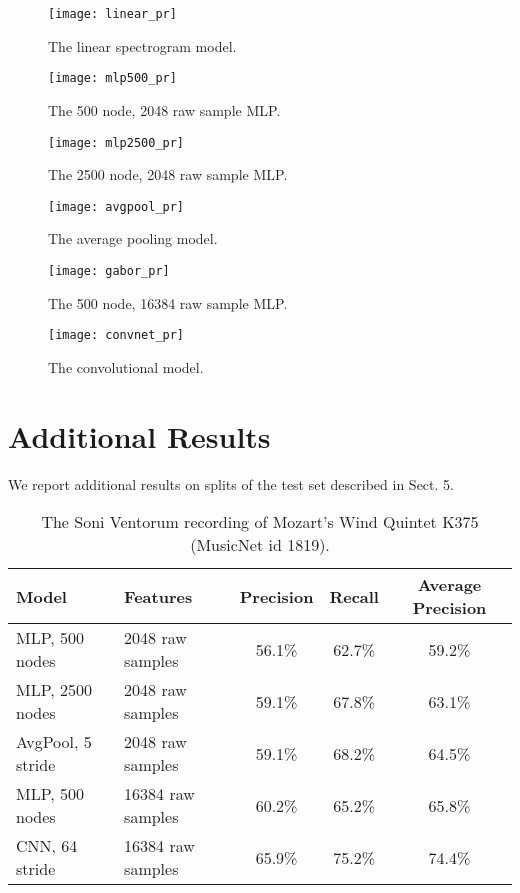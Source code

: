 \documentclass{article} \usepackage{iclr2017_conference,times}
\begin{document}
\begin{figure}[h]
  \centering
  \captionsetup{width=1.7in}
  
\begin{minipage}{.48\textwidth}
  \texttt{[image: linear\_pr]}
  \caption{{\footnotesize The linear spectrogram model.}}
\end{minipage}
\begin{minipage}{.48\textwidth}
  \texttt{[image: mlp500\_pr]}
  \caption{{\footnotesize The 500 node, 2048 raw sample MLP.}}
\end{minipage}
\begin{minipage}{.48\textwidth}
  \texttt{[image: mlp2500\_pr]}
  \caption{{\footnotesize The 2500 node, 2048 raw sample MLP.}}
\end{minipage}
\begin{minipage}{.48\textwidth}
  \texttt{[image: avgpool\_pr]}
  \caption{{\footnotesize The average pooling model.}}
\end{minipage}
\begin{minipage}{.48\textwidth}
  \texttt{[image: gabor\_pr]}
  \caption{{\footnotesize The 500 node, 16384 raw sample MLP.}}
\end{minipage}
\begin{minipage}{.48\textwidth}
  \texttt{[image: convnet\_pr]}
  \caption{{\footnotesize The convolutional model.}}
\end{minipage}
\end{figure} \clearpage

\section{Additional Results}

We report additional results on splits of the test set described in Sect. 5.

\begin{table}[h]
  \centering
  \begin{tabular}{llccc}
    \toprule
    \cmidrule{1-5}
    Model & Features & Precision & Recall & Average Precision \\
    \midrule
    MLP, 500 nodes & 2048 raw samples & 56.1\% & 62.7\% & 59.2\% \\
    MLP, 2500 nodes & 2048 raw samples & 59.1\% & 67.8\% & 63.1\% \\
    AvgPool, 5 stride & 2048 raw samples & 59.1\% & 68.2\% & 64.5\% \\
    MLP, 500 nodes & 16384 raw samples & 60.2\% & 65.2\% & 65.8\% \\
    CNN, 64 stride & 16384 raw samples & 65.9\% & 75.2\% & 74.4\% \\
    \bottomrule
  \end{tabular}
  \caption{The Soni Ventorum recording of Mozart's Wind Quintet K375 (MusicNet id 1819).}
\end{table}
\end{document}
